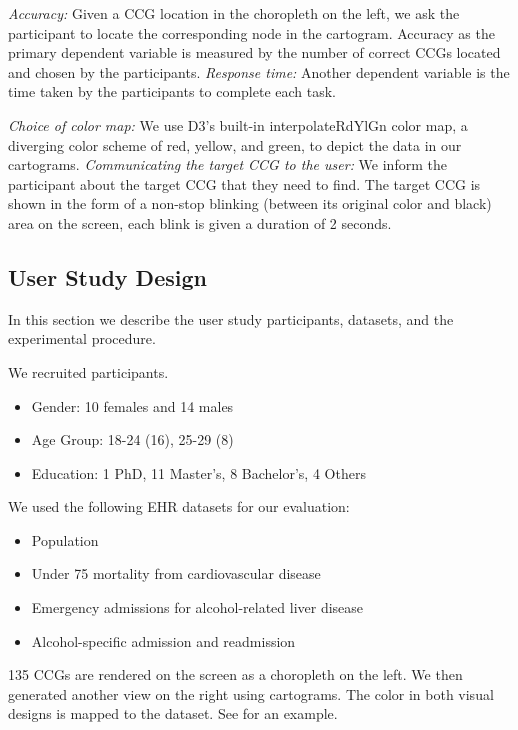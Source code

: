 \textit{Accuracy:} Given a CCG location in the choropleth on the left, we ask the participant to locate the corresponding node in the cartogram. Accuracy as the primary dependent variable is measured by the number of correct CCGs located and chosen by the participants. \textit{Response time:} Another dependent variable is the time taken by the participants to complete each task.

\textit{Choice of color map:} We use D3's built-in interpolateRdYlGn color map, a diverging color scheme of red, yellow, and green, to depict the data in our cartograms. \textit{Communicating the target CCG to the user:} We inform the participant about the target CCG that they need to find. The target CCG is shown in the form of a non-stop blinking (between its original color and black) area on the screen, each blink is given a duration of 2 seconds.

\subsection{User Study Design}
In this section we describe the user study participants, datasets, and the experimental procedure.

 We recruited \pCount participants.

\begin{itemize}
    \item Gender: 10 females and 14 males
    \item Age Group: 18-24 (16), 25-29 (8)
    \item Education: 1 PhD, 11 Master's, 8 Bachelor's, 4 Others
\end{itemize}

 We used the following EHR datasets for our evaluation:

\begin{itemize}
    \item Population
    \item Under 75 mortality from cardiovascular disease
    \item Emergency admissions for alcohol-related liver disease
    \item Alcohol-specific admission and readmission
\end{itemize}

135 CCGs are rendered on the screen as a choropleth on the left. We then generated another view on the right using cartograms. The color in both visual designs is mapped to the dataset. See  for an example.

